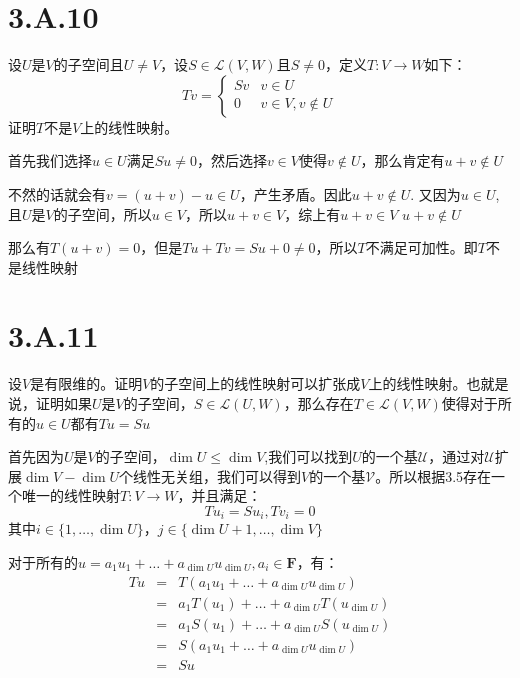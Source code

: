 \documentclass[10pt,a4paper,UTF8]{article}
\begin{document}
\section{3.A.10}
\label{sec:org6eeb9c0}


\begin{problem}
设\(U\)是\(V\)的子空间且\(U\neq V\)，设\(S\in \mathcal{L}(V,W)\)且\(S\neq 0\)，定义\(T:V\rightarrow W\)如下：
\begin{equation}
\label{eq:16}
Tv = 
\begin{cases}
Sv & v\in U \\
0 & v\in V, v\notin U
\end{cases}
\end{equation}
证明\(T\)不是\(V\)上的线性映射。
\end{problem}

\begin{answer}
首先我们选择\(u\in U\)满足\(Su\neq 0\)，然后选择\(v\in V\)使得\(v\notin U\)，那么肯定有\(u+v\notin U\)

不然的话就会有\(v = (u+v) - u \in U\)，产生矛盾。因此\(u+v\notin U\). 又因为\(u\in U\),且\(U\)是\(V\)的子空间，所以\(u\in V\)，所以\(u+v \in V\)，综上有\(u+v \in V\) \(u+v \notin U\)

那么有\(T(u+v) = 0\)，但是\(Tu + Tv = Su + 0 \neq 0\)，所以\(T\)不满足可加性。即\(T\)不是线性映射
\end{answer}


\section{3.A.11}
\label{sec:org5f6e9c6}


\begin{problem}
设\(V\)是有限维的。证明\(V\)的子空间上的线性映射可以扩张成\(V\)上的线性映射。也就是说，证明如果\(U\)是\(V\)的子空间，\(S\in \mathcal{L}(U,W)\)，那么存在\(T\in \mathcal{L}(V,W)\)使得对于所有的\(u\in U\)都有\(Tu = Su\)
\end{problem}

\begin{answer}
首先因为\(U\)是\(V\)的子空间，\(\dim U \leq \dim V\),我们可以找到\(U\)的一个基\(\mathcal{U}\)，通过对\(\mathcal{U}\)扩展\(\dim V-\dim U\)个线性无关组，我们可以得到\(V\)的一个基\(\mathcal{V}\)。所以根据3.5存在一个唯一的线性映射\(T:V\rightarrow W\)，并且满足：
\begin{equation}
\label{eq:12}
Tu_{i} = Su_{i},Tv_{i} = 0
\end{equation}
其中\(i\in \{1,\ldots ,\dim U\}\)，\(j\in \{\dim U +1,\ldots ,\dim V\}\)

对于所有的\(u = a_{1}u_{1} + \ldots + a_{\dim U}u_{\dim U} , a_{i}\in \mathbf{F}\)，有：
\begin{eqnarray}
\label{eq:17}
Tu&=&T(a_{1}u_{1} + \ldots + a_{\dim U}u_{\dim U}) \\
&=&a_{1}T(u_{1}) + \ldots + a_{\dim U}T(u_{\dim U}) \\
&=&a_{1}S(u_{1}) + \ldots + a_{\dim U}S(u_{\dim U}) \\
&=&S(a_{1}u_{1} + \ldots + a_{\dim U}u_{\dim U}) \\
&=&Su
\end{eqnarray}
\end{answer}
\end{document}
